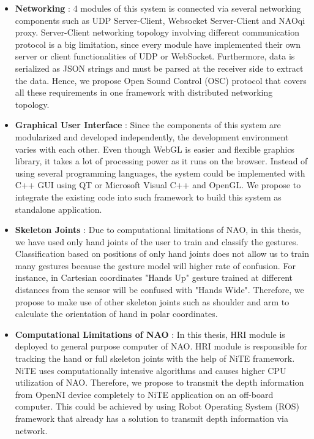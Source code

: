 \begin{itemize}
		\item \textbf{Networking} : 4 modules of this system is connected via several networking components such as UDP Server-Client, Websocket Server-Client and NAOqi proxy. Server-Client networking topology involving different communication protocol is a big limitation, since every module have implemented their own server or client functionalities of UDP or WebSocket. Furthermore, data is serialized as JSON strings and must be parsed at the receiver side to extract the data. Hence, we propose Open Sound Control (OSC) protocol that covers all these requirements in one framework with distributed networking topology.
		
		\item \textbf{Graphical User Interface} : Since the components of this system are modularized and developed independently, the development environment varies with each other. Even though WebGL is easier and flexible graphics library, it takes a lot of processing power as it runs on the browser. Instead of using several programming languages, the system could be implemented with C++ GUI using QT or Microsoft Visual C++ and OpenGL. We propose to integrate the existing code into such framework to build this system as standalone application. 
		
		\item \textbf{Skeleton Joints} :  Due to computational limitations of NAO, in this thesis, we have used only hand joints of the user to train and classify the gestures. Classification based on positions of only hand joints does not allow us to train many gestures because the gesture model will higher rate of confusion. For instance, in Cartesian coordinates "Hands Up" gesture trained at different distances from the sensor will be confused with "Hands Wide". Therefore, we propose to make use of other skeleton joints such as shoulder and arm to calculate the orientation of hand in polar coordinates.
		
		\item \textbf{Computational Limitations of NAO} : In this thesis, HRI module is deployed to general purpose computer of NAO. HRI module is responsible for tracking the hand or full skeleton joints with the help of NiTE framework. NiTE uses computationally intensive algorithms and causes higher CPU utilization of NAO. Therefore, we propose to transmit the depth information from OpenNI device completely to NiTE application on an off-board computer. This could be achieved by using Robot Operating System (ROS) framework that already has a solution to transmit depth information via network.
		
\end{itemize}